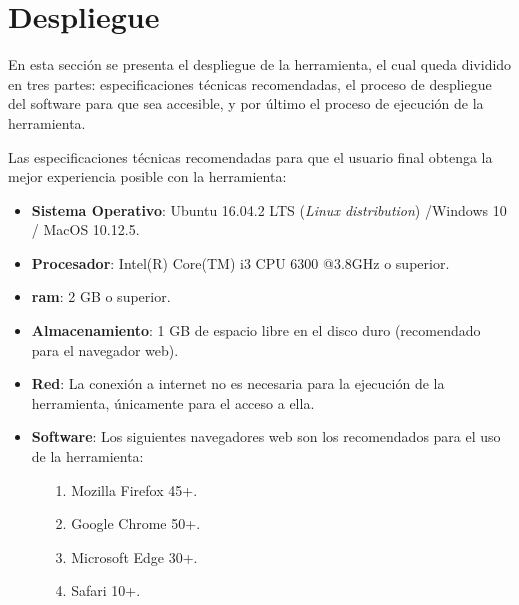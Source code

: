 \section{Despliegue}
\label{sec:deployment}

En esta sección se presenta el despliegue de la herramienta, el cual queda dividido en tres partes: especificaciones técnicas recomendadas, el proceso de despliegue del software para que sea accesible, y por último el proceso de ejecución de la herramienta.

Las especificaciones técnicas recomendadas para que el usuario final obtenga la mejor experiencia posible con la herramienta:

\begin{itemize}

\item \textbf{Sistema Operativo}: Ubuntu 16.04.2 LTS (\emph{Linux distribution}) /Windows 10 / MacOS 10.12.5.

\item \textbf{Procesador}: Intel(R) Core(TM) i3 CPU 6300 @3.8GHz o superior.

\item \textbf{\gls{ram}}: 2 GB o superior.

\item \textbf{Almacenamiento}: 1 GB de espacio libre en el disco duro (recomendado para el navegador web).

\item \textbf{Red}: La conexión a internet no es necesaria para la ejecución de la herramienta, únicamente para el acceso a ella.

\item \textbf{Software}: Los siguientes navegadores web son los recomendados para el uso de la herramienta:

	\begin{itemize}

	\item[1.] Mozilla Firefox 45+.
	
	\item[2.] Google Chrome 50+.
	
	\item[3.] Microsoft Edge 30+.
	
	\item[4.] Safari 10+.

	\end{itemize}

\end{itemize}

